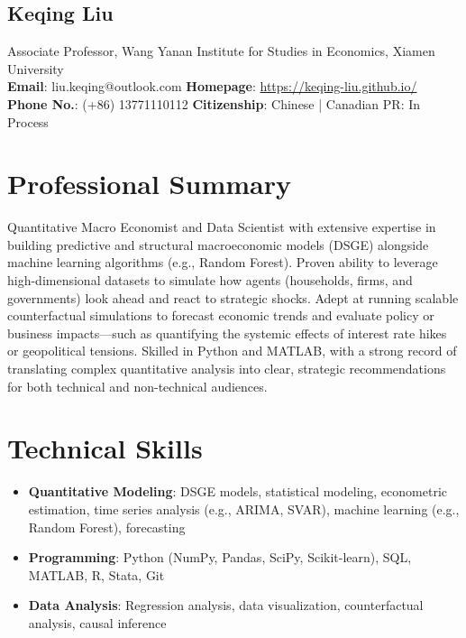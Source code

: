 \documentclass[11pt]{article}
\begin{document}
\begin{center}

\section*{Keqing Liu}

\end{center}

\begin{center}
Associate Professor, Wang Yanan Institute for Studies in Economics,  Xiamen University \\ 
\textbf{Email}: liu.keqing@outlook.com \quad \textbf{Homepage}: \url{https://keqing-liu.github.io/} \\
\vspace{0.1in}
\textbf{Phone No.}: (+86) 13771110112 \quad  \textbf{Citizenship}: Chinese | Canadian PR: In Process

\end{center}

\section*{Professional Summary}
Quantitative Macro Economist and Data Scientist with extensive expertise in building predictive and structural macroeconomic models (DSGE) alongside machine learning algorithms (e.g., Random Forest).
Proven ability to leverage high-dimensional datasets to simulate how agents (households, firms, and governments) look ahead and react to strategic shocks.
Adept at running scalable counterfactual simulations to forecast economic trends and evaluate policy or business impacts—such as quantifying the systemic effects of interest rate hikes or geopolitical tensions.
Skilled in Python and MATLAB, with a strong record of translating complex quantitative analysis into clear, strategic recommendations for both technical and non-technical audiences.
\section*{Technical Skills}
\begin{itemize}
    \item \textbf{Quantitative Modeling}: DSGE models, statistical modeling, econometric estimation, time series analysis (e.g., ARIMA, SVAR), machine learning (e.g., Random Forest),  forecasting
    \item \textbf{Programming}: Python (NumPy, Pandas, SciPy, Scikit-learn), SQL, MATLAB, R, Stata, Git
    \item \textbf{Data Analysis}: Regression analysis, data visualization, counterfactual analysis, causal inference
\end{itemize}
\end{document}

